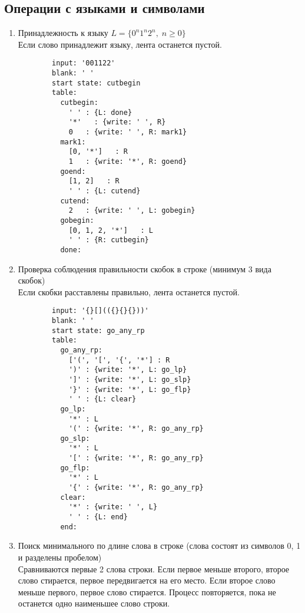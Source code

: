 \documentclass{article}
\begin{document}
\subsection{Операции с языками и символами}
\begin{enumerate}
    \item Принадлежность к языку $L = \{0^n1^n2^n, \; n \geq 0\}$\\ Если слово принадлежит языку, лента останется пустой.
    \begin{verbatim}
        input: '001122'
        blank: ' '
        start state: cutbegin
        table:
          cutbegin:
            ' ' : {L: done}
            '*'   : {write: ' ', R}
            0   : {write: ' ', R: mark1}
          mark1:
            [0, '*']   : R
            1   : {write: '*', R: goend}
          goend:
            [1, 2]   : R
            ' ' : {L: cutend}
          cutend:
            2   : {write: ' ', L: gobegin}
          gobegin:
            [0, 1, 2, '*']   : L
            ' ' : {R: cutbegin}
          done:
    \end{verbatim}
    \item Проверка соблюдения правильности скобок в строке (минимум 3 вида скобок)\\ Если скобки расставлены правильно, лента останется пустой.
    \begin{verbatim}
        input: '{}[](({}{}{}))'
        blank: ' '
        start state: go_any_rp
        table:
          go_any_rp:
            ['(', '[', '{', '*'] : R
            ')' : {write: '*', L: go_lp}
            ']' : {write: '*', L: go_slp}
            '}' : {write: '*', L: go_flp}
            ' ' : {L: clear}
          go_lp:
            '*' : L
            '(' : {write: '*', R: go_any_rp}
          go_slp:
            '*' : L
            '[' : {write: '*', R: go_any_rp}
          go_flp:
            '*' : L
            '{' : {write: '*', R: go_any_rp}
          clear:
            '*' : {write: ' ', L}
            ' ' : {L: end}
          end:
    \end{verbatim}
    \item Поиск минимального по длине слова в строке (слова состоят из символов 0, 1 и разделены пробелом)\\ Сравниваются первые 2 слова строки. Если первое меньше второго, второе слово стирается, первое передвигается на его место. Если второе слово меньше первого, первое слово стирается. Процесс повторяется, пока не останется одно наименьшее слово строки.
    \begin{verbatim}

\end{verbatim}
\end{enumerate}
\end{document}
